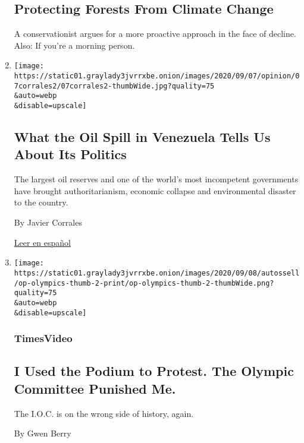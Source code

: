 \begin{enumerate}
  \hypertarget{protecting-forests-from-climate-change}{%
  \subsection{Protecting Forests From Climate
  Change}\label{protecting-forests-from-climate-change}}

  A conservationist argues for a more proactive approach in the face of
  decline. Also: If you're a morning person.
\item
  \href{/2020/09/07/opinion/venezuela-oil-spill-maduro.html}{}

  \texttt{[image: https://static01.graylady3jvrrxbe.onion/images/2020/09/07/opinion/07corrales2/07corrales2-thumbWide.jpg?quality=75\\\&auto=webp\\\&disable=upscale]}

  \hypertarget{what-the-oil-spill-in-venezuela-tells-us-about-its-politics}{%
  \subsection{What the Oil Spill in Venezuela Tells Us About Its
  Politics}\label{what-the-oil-spill-in-venezuela-tells-us-about-its-politics}}

  The largest oil reserves and one of the world's most incompetent
  governments have brought authoritarianism, economic collapse and
  environmental disaster to the country.

  By Javier Corrales

  \href{https://www.nytimes3xbfgragh.onion/es/2020/09/07/espanol/opinion/lo-que-los-derrames-petroleros-en-venezuela-revelan.html}{Leer
  en español}
\item
  \href{/video/opinion/100000007308961/gwen-berry-olympics-protest.html}{}

  \texttt{[image: https://static01.graylady3jvrrxbe.onion/images/2020/09/08/autossell/op-olympics-thumb-2-print/op-olympics-thumb-2-thumbWide.png?quality=75\\\&auto=webp\\\&disable=upscale]}

  \hypertarget{timesvideo}{%
  \subsubsection{TimesVideo}\label{timesvideo}}

  \hypertarget{i-used-the-podium-to-protest-the-olympic-committee-punished-me-1}{%
  \subsection{I Used the Podium to Protest. The Olympic Committee
  Punished
  Me.}\label{i-used-the-podium-to-protest-the-olympic-committee-punished-me-1}}

  The I.O.C. is on the wrong side of history, again.

  By Gwen Berry
\end{enumerate}

